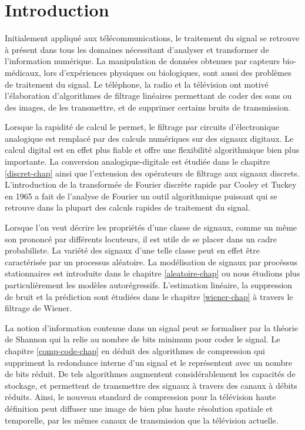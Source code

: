 \chapter{Introduction}

Initialement appliqu\'e aux t\'el\'ecommunications, le traitement
du signal se retrouve \`a pr\'esent
dans tous les domaines n\'ecessitant d'analyser et transformer
de l'information num\'erique.
La manipulation de donn\'ees obtenues par capteurs
bio-m\'edicaux, lors d'exp\'eriences physiques ou biologiques,
sont aussi des probl\`emes de traitement du signal.
Le t\'el\'ephone, la radio et la t\'el\'evision ont motiv\'e l'\'elaboration
d'algorithmes de filtrage lin\'eaires permettant de coder
des sons ou des images, de les transmettre, et de supprimer
certains bruits de transmission.


Lorsque la rapidit\'e de calcul le permet,
le filtrage par circuits d'\'electronique
analogique est remplac\'e par des calculs num\'eriques
sur des signaux digitaux. Le calcul digital est en effet plus
fiable et offre une flexibilit\'e algorithmique bien plus
importante.
La conversion analogique-digitale est \'etudi\'ee
dans le chapitre \ref{discret-chap}
ainsi que l'extension des op\'erateurs de filtrage
aux signaux discrets. L'introduction de
la transform\'ee de Fourier discr\`ete rapide
par Cooley et Tuckey en 1965
a fait de l'analyse de Fourier un outil algorithmique
puissant qui se retrouve dans la
plupart des calculs rapides de traitement du signal.

Lorsque l'on veut d\'ecrire les propri\'et\'es d'une classe de signaux,
comme un m\^eme son prononc\'e par diff\'erents locuteurs,
il est utile de se placer dans un cadre probabiliste.
La vari\'et\'e des signaux d'une telle classe peut en effet
\^etre caract\'eris\'ee par un processus al\'eatoire.
La mod\'elisation de signaux par proc\'essus stationnaires est
introduite dans le
chapitre \ref{aleatoire-chap}
ou nous \'etudions plus particuli\`erement
les mod\`eles autor\'egressifs.
L'estimation lin\'eaire, la suppression de bruit
et la pr\'ediction sont \'etudi\'ees dans le chapitre
\ref{wiener-chap} \`a travers le filtrage de Wiener.


La notion d'information contenue dans un signal peut se formaliser
par la th\'eorie de Shannon qui la relie au nombre de bits minimum
pour coder le signal. Le chapitre \ref{comp-code-chap}
en d\'eduit des algorithmes de compression
qui suppriment la redondance interne
d'un signal et le repr\'esentent avec un nombre de bits r\'eduit.
De tels algorithmes augmentent consid\'erablement les capacit\'es de
stockage, et permettent de transmettre
des signaux \`a travers des canaux \`a d\'ebits r\'eduits.
Ainsi, le nouveau
standard de compression pour la t\'el\'evision haute d\'efinition peut
diffuser une image de bien plus haute r\'esolution spatiale
et temporelle, par les m\^emes canaux de transmission
que la t\'el\'evision actuelle.

